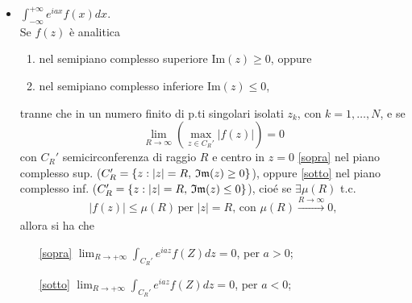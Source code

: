 \begin{itemize}
    \item $\displaystyle \int_{-\infty}^{+\infty} e^{iax}f(x)dx$. \\
        Se $f(z)$ è analitica 
        \begin{enumerate}[label=(\roman*)]
            \item \label{sopra} nel semipiano complesso superiore Im$(z)\ge0$, oppure
            \item \label{sotto} nel semipiano complesso inferiore Im$(z)\le0$,
        \end{enumerate}
        tranne che in un numero finito di p.ti singolari isolati $z_k$, con $k=1, \dots, N$, e se 
        \[
            \lim_{R\to\infty}\left(\max_{z\in C_R'}|f(z)|\right) = 0
        \]
        con $C_R'$ semicirconferenza di raggio $R$ e centro in $z=0$ \ref{sopra} nel piano complesso sup. ($C_R'=\{z:|z|=R,\, \mathfrak{Im}(z)\ge 0\}$), oppure \ref{sotto} nel piano complesso inf. ($C_R'=\{z:|z|=R,\, \mathfrak{Im} (z)\le 0\}$), cioé se $\exists \mu(R)$ t.c. 
        \[
            |f(z)|\le\mu(R)\,\text{per }|z|=R,\,\text{con }\mu(R)\xrightarrow[]{R\to\infty}0,
        \]
        allora si ha che
        \begin{enumerate}
            \item[\ref{sopra}] $\displaystyle\lim_{R\to+\infty}\int_{C_R'}e^{iaz}f(Z)dz=0$, per $a>0$;
            \item[\ref{sotto}] $\displaystyle\lim_{R\to+\infty}\int_{C_R'}e^{iaz}f(Z)dz=0$, per $a<0$;
        \end{enumerate}
        \begin{center}
        \end{center}

\end{itemize}
